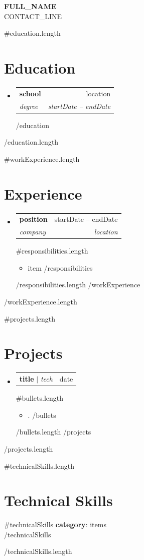 \documentclass[letterpaper,11pt]{article}
\makeatletter
\newcommand{\resumeItem}[1]{\item\small{#1 \vspace{-2pt}}}
\newcommand{\resumeSubheading}[4]{
  \vspace{-2pt}\item
  \begin{tabular*}{\textwidth}[t]{l@{\extracolsep{\fill}}r}
    \textbf{#1} & #2 \\
    \textit{\small#3} & \textit{\small #4} \\
  \end{tabular*}\vspace{-14pt}
}
\newcommand{\resumeProjectHeading}[2]{
  \item
  \begin{tabular*}{\textwidth}[t]{l@{\extracolsep{\fill}}r}
    \small#1 & #2 \\
  \end{tabular*}\vspace{-14pt}
}
\newcommand{\resumeSubHeadingListStart}{\begin{itemize}[leftmargin=0in, label={}]}
\newcommand{\resumeSubHeadingListEnd}{\end{itemize}}
\newcommand{\resumeItemListStart}{
\begin{itemize}[
  label=$\bullet$
  ]}
\newcommand{\resumeItemListEnd}{\end{itemize}\vspace{-4pt}}
\makeatother
\begin{document}
\begin{center}
  \textbf{\Huge \scshape {{FULL_NAME}} } \\ \vspace{1pt}
  \small {{{CONTACT_LINE}}}
\end{center}



{{#education.length}}
\section{Education}
\resumeSubHeadingListStart
{{#education}}
  \resumeSubheading
    { {{school}} }
    { {{location}} }
    { {{degree}} }
    { {{startDate}} -- {{endDate}} }
{{/education}}

\resumeSubHeadingListEnd
{{/education.length}}

{{#workExperience.length}}
\section{Experience}
\resumeSubHeadingListStart
{{#workExperience}}
  \resumeSubheading
  { {{position}} }
  { {{startDate}} -- {{endDate}} }
  { {{company}} }
  { {{location}} }
  {{#responsibilities.length}}
  \resumeItemListStart
    {{#responsibilities}}
        \resumeItem{ {{item}} }
    {{/responsibilities}}
  \resumeItemListEnd
  {{/responsibilities.length}}
{{/workExperience}}
\resumeSubHeadingListEnd
{{/workExperience.length}}

{{#projects.length}}
\section{Projects}
\resumeSubHeadingListStart
{{#projects}}
  \resumeProjectHeading
    { \textbf{ {{title}} } $|$ \emph{ {{tech}} } }
    { {{date}} }
  {{#bullets.length}}
  \resumeItemListStart
    {{#bullets}}
      \resumeItem{ {{.}} }
    {{/bullets}}
  \resumeItemListEnd
  {{/bullets.length}}
{{/projects}}
\resumeSubHeadingListEnd
{{/projects.length}}

{{#technicalSkills.length}}
\section{Technical Skills}
\begin{itemize}[leftmargin=0.15in, label={}]
  \small{
    \item{
      {{#technicalSkills}}
        \textbf{ {{{category}}}}: {{{items}}} \\
      {{/technicalSkills}}
    }
  }
\end{itemize}
{{/technicalSkills.length}}
\end{document}
